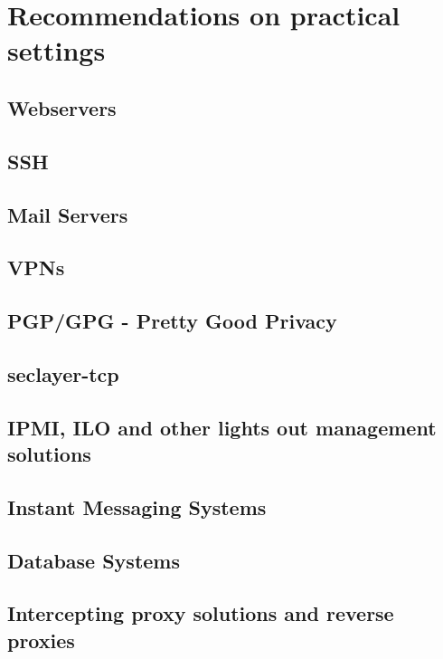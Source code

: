 \section{Recommendations on practical settings}
\label{section:PracticalSettings}


\subsection{Webservers}


\subsection{SSH}


\subsection{Mail Servers}



\subsection{VPNs}



\subsection{PGP/GPG - Pretty Good Privacy}



\subsection{seclayer-tcp}



\subsection{IPMI, ILO and other lights out management solutions}





\subsection{Instant Messaging Systems}



\subsection{Database Systems}



\subsection{Intercepting proxy solutions and reverse proxies}
 



